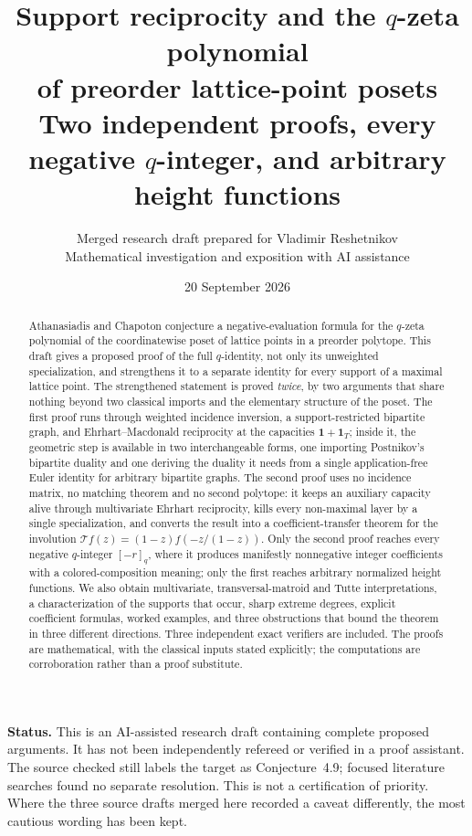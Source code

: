 \documentclass[11pt]{article}
\title{\color{Ink}\bfseries Support reciprocity and the \texorpdfstring{$q$}{q}-zeta polynomial\protect\\
of preorder lattice-point posets\\[0.45em]
\large Two independent proofs, every negative \texorpdfstring{$q$}{q}-integer,
and arbitrary height functions}
\author{Merged research draft prepared for Vladimir Reshetnikov\\
\small Mathematical investigation and exposition with AI assistance}
\date{20 September 2026}
\numberwithin{equation}{section}
\theoremstyle{definition}
\theoremstyle{remark}
\newcommand{\one}{\mathbf 1}
\newcommand{\Tr}{\mathcal T}
\newcommand{\qint}[1]{[#1]_q}
\begin{document}
\maketitle
\begin{abstract}
Athanasiadis and Chapoton conjecture a negative-evaluation formula for the
$q$-zeta polynomial of the coordinatewise poset of lattice points in a
preorder polytope. This draft gives a proposed proof of the full
$q$-identity, not only its unweighted specialization, and strengthens it to a
separate identity for every support of a maximal lattice point. The
strengthened statement is proved \emph{twice}, by two arguments that share
nothing beyond two classical imports and the elementary structure of the
poset. The first proof runs through weighted incidence inversion, a
support-restricted bipartite graph, and Ehrhart--Macdonald reciprocity at the
capacities $\one+\one_T$; inside it, the geometric step is available in two
interchangeable forms, one importing Postnikov's bipartite duality and one
deriving the duality it needs from a single application-free Euler identity
for arbitrary bipartite graphs. The second proof uses no incidence matrix, no
matching theorem and no second polytope: it keeps an auxiliary capacity alive
through multivariate Ehrhart reciprocity, kills every non-maximal layer by a
single specialization, and converts the result into a coefficient-transfer
theorem for the involution $\Tr f(z)=(1-z)f(-z/(1-z))$. Only the second proof
reaches every negative $q$-integer $\qint{-r}$, where it produces manifestly
nonnegative integer coefficients with a colored-composition meaning; only the
first reaches arbitrary normalized height functions. We also obtain
multivariate, transversal-matroid and Tutte interpretations, a
characterization of the supports that occur, sharp extreme degrees, explicit
coefficient formulas, worked examples, and three obstructions that bound the
theorem in three different directions. Three independent exact verifiers are
included. The proofs are mathematical, with the classical inputs stated
explicitly; the computations are corroboration rather than a proof
substitute.
\end{abstract}

\noindent\textbf{Status.} This is an AI-assisted research draft containing
complete proposed arguments. It has not been independently refereed or
verified in a proof assistant. The source checked still labels the target as
Conjecture~4.9; focused literature searches found no separate resolution.
This is not a certification of priority. Where the three source drafts merged
here recorded a caveat differently, the most cautious wording has been kept.
\end{document}

